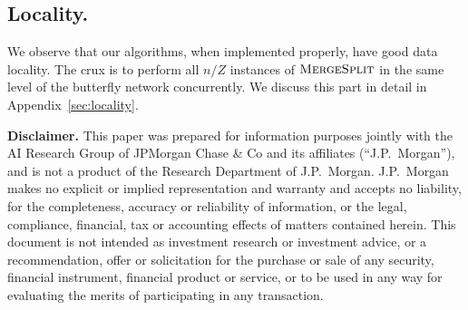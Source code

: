 \subsection{Locality.}
We observe that our algorithms, when implemented properly, have good data locality.
The crux is to perform all $n/Z$ instances of 
$\textsc{MergeSplit}$ in the same level of the butterfly network concurrently.
We discuss this part in detail in Appendix~\ref{sec:locality}. 


\medskip
{\small
\noindent
{\bf Disclaimer.}
This paper was prepared for information purposes jointly with the AI Research Group of JPMorgan Chase \& Co and its affiliates (“J.P.~Morgan”), and is not a product of the Research Department of J.P.~Morgan. J.P.~Morgan makes no explicit or implied representation and warranty and accepts no liability, for the completeness, accuracy or reliability of information, or the legal, compliance, financial, tax or accounting effects of matters contained herein. This document is not intended as investment research or investment advice, or a recommendation, offer or solicitation for the purchase or sale of any security, financial instrument, financial product or service, or to be used in any way for evaluating the merits of participating in any transaction.
}
